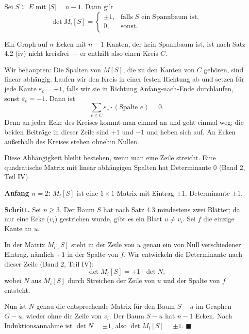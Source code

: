 \begin{merksatz}
Sei $S \subseteq E$ mit $|S| = n-1$. Dann gilt
\[ \det M_i[S] = \begin{cases} \pm 1, & \text{falls } S \text{ ein Spannbaum ist},\\ 0, & \text{sonst.}\end{cases} \]

Ein Graph auf $n$ Ecken mit $n-1$ Kanten, der kein Spannbaum ist, ist nach Satz 4.2 (iv) nicht kreisfrei --- er enthält also einen Kreis $C$.

Wir behaupten: Die Spalten von $M[S]$, die zu den Kanten von $C$ gehören, sind linear abhängig. Laufen wir den Kreis in einer festen Richtung ab und setzen für jede Kante $\varepsilon_e = +1$, falls wir sie in Richtung Anfang-nach-Ende durchlaufen, sonst $\varepsilon_e = -1$. Dann ist
\[ \sum_{e \in C} \varepsilon_e \cdot (\text{Spalte } e) = 0 . \]
Denn an jeder Ecke des Kreises kommt man einmal an und geht einmal weg; die beiden Beiträge in dieser Zeile sind $+1$ und $-1$ und heben sich auf. An Ecken außerhalb des Kreises stehen ohnehin Nullen.

Diese Abhängigkeit bleibt bestehen, wenn man eine Zeile streicht. Eine quadratische Matrix mit linear abhängigen Spalten hat Determinante $0$ (Band 2, Teil IV).

\textbf{Anfang $n = 2$:} $M_i[S]$ ist eine $1\times 1$-Matrix mit Eintrag $\pm 1$, Determinante $\pm 1$. \checkmark

\textbf{Schritt.} Sei $n \ge 3$. Der Baum $S$ hat nach Satz 4.3 mindestens zwei Blätter; da nur eine Ecke ($v_i$) gestrichen wurde, gibt es ein Blatt $u \neq v_i$. Sei $f$ die einzige Kante an $u$.

In der Matrix $M_i[S]$ steht in der Zeile von $u$ genau ein von Null verschiedener Eintrag, nämlich $\pm 1$ in der Spalte von $f$. Wir entwickeln die Determinante nach dieser Zeile (Band 2, Teil IV):
\[ \det M_i[S] = \pm 1 \cdot \det N, \]
wobei $N$ aus $M_i[S]$ durch Streichen der Zeile von $u$ und der Spalte von $f$ entsteht.

Nun ist $N$ genau die entsprechende Matrix für den Baum $S - u$ im Graphen $G - u$, wieder ohne die Zeile von $v_i$. Der Baum $S-u$ hat $n-1$ Ecken. Nach Induktionsannahme ist $\det N = \pm 1$, also $\det M_i[S] = \pm 1$. $\blacksquare$
\end{merksatz}

